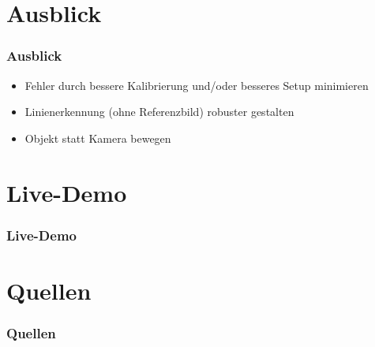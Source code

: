 \documentclass[xcolor=dvipsnames]{beamer}
\begin{document}

\section{Ausblick}
\begin{frame}
	\frametitle{Ausblick}

	\begin{itemize}
		\item Fehler durch bessere Kalibrierung und/oder besseres Setup minimieren
		\item Linienerkennung (ohne Referenzbild) robuster gestalten
		\item Objekt statt Kamera bewegen
	\end{itemize}

\end{frame}


\section{Live-Demo} 
\begin{frame}
	\frametitle{Live-Demo}
\end{frame}


\section{Quellen} 
\begin{frame}
	\frametitle{Quellen}

\end{frame}
\end{document}
